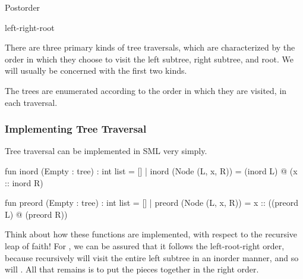 \documentclass[aspectratio=169]{beamer}
\begin{document}
\begin{frame}[fragile]
\begin{minipage}{0.32\textwidth}
\begin{center}
        \vspace{5pt}

        Postorder

        \vspace{5pt}

        {\color{black!15!red}left}-{\color{black!10!blue}right}-{\color{black!10!green}root}
    \end{center}
  \end{minipage}

  \vspace{\fill}

  There are three primary kinds of tree traversals, which are characterized by the
  order in which they choose to visit the left subtree, right subtree, and root.
  We will usually be concerned with the first two kinds.

  \vspace{\fill}

  The trees are enumerated according to the order in which they are visited, in
  each traversal.
\end{frame}

\begin{frame}[fragile]
  \frametitle{Implementing Tree Traversal}

  \rprs

  Tree traversal can be implemented in SML very simply.

  \pause
  \begin{codeblock}
    fun inord (Empty : tree) : int list = []
      | inord (Node (L, x, R)) = (inord L) @ (x :: inord R)

    fun preord (Empty : tree) : int list = []
      | preord (Node (L, x, R)) = x :: ((preord L) @ (preord R))
  \end{codeblock}

  \pause
  \vspace{\fill}

  Think about how these functions are implemented, with respect to the
  recursive leap of faith! For , we can be assured that it
  follows the left-root-right order, because recursively 
  will visit the entire left subtree in an inorder manner, and so will
  . All that remains is to put the pieces together in the
  right order.

\end{frame}


\end{document}
